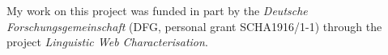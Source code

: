 
My work on this project was funded in part by the \textit{Deutsche Forschungsgemeinschaft} (DFG, personal grant SCHA1916/1-1) through the project \textit{Linguistic Web Characterisation}.

